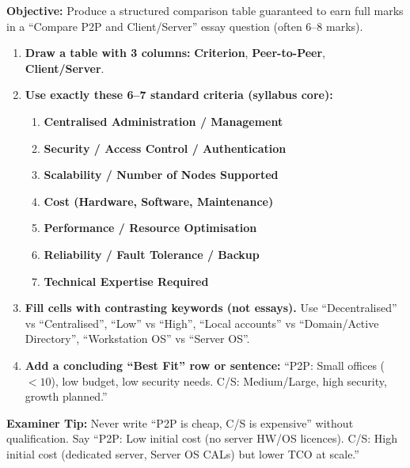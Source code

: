 \documentclass[11pt]{article}
\begin{document}
\begin{methode}
\textbf{Objective:} Produce a structured comparison table guaranteed to earn full marks in a ``Compare P2P and Client/Server'' essay question (often 6--8 marks).

\begin{enumerate}
    \item \textbf{Draw a table with 3 columns:} \textbf{Criterion}, \textbf{Peer-to-Peer}, \textbf{Client/Server}.
    \item \textbf{Use exactly these 6--7 standard criteria (syllabus core):}
    \begin{enumerate}
        \item \textbf{Centralised Administration / Management}
        \item \textbf{Security / Access Control / Authentication}
        \item \textbf{Scalability / Number of Nodes Supported}
        \item \textbf{Cost (Hardware, Software, Maintenance)}
        \item \textbf{Performance / Resource Optimisation}
        \item \textbf{Reliability / Fault Tolerance / Backup}
        \item \textbf{Technical Expertise Required}
    \end{enumerate}
    \item \textbf{Fill cells with contrasting keywords (not essays).} Use ``Decentralised'' vs ``Centralised'', ``Low'' vs ``High'', ``Local accounts'' vs ``Domain/Active Directory'', ``Workstation OS'' vs ``Server OS''.
    \item \textbf{Add a concluding ``Best Fit'' row or sentence:} ``P2P: Small offices ($<10$), low budget, low security needs. C/S: Medium/Large, high security, growth planned.''
\end{enumerate}
\textbf{Examiner Tip:} Never write ``P2P is cheap, C/S is expensive'' without qualification. Say ``P2P: Low initial cost (no server HW/OS licences). C/S: High initial cost (dedicated server, Server OS CALs) but lower TCO at scale.''
\end{methode}
\end{document}
